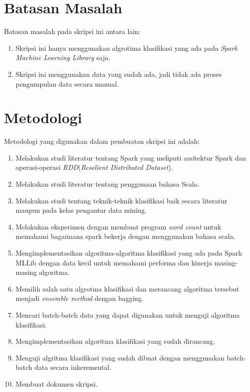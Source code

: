 \section{Batasan Masalah}
\label{sec:batasan}
Batasan masalah pada skripsi ini antara lain:
\begin{enumerate}
\item Skripsi ini hanya menggunakan algrotima klasifikasi yang ada pada \textit{Spark Machine Learning Library} saja.
\item Skripsi ini menggunakan data yang sudah ada, jadi tidak ada proses pengumpulan data secara manual.
\end{enumerate}


\section{Metodologi}
\label{sec:metlit}
Metodologi yang digunakan dalam pembuatan skripsi ini adalah:
\begin{enumerate}
\item Melakukan studi literatur tentang Spark yang meliputi arsitektur Spark dan operasi-operasi \textit{RDD}(\textit{Reselient Distributed Dataset}).
\item Melakukan studi literatur tentang penggunaan bahasa Scala.
\item Melakukan studi tentang teknik-teknik klasifikasi baik secara literatur maupun pada kelas pengantar data mining.
\item Melakukan eksperimen dengan membuat program \textit{word count} untuk memahami bagaimana spark bekerja dengan menggunakan bahasa scala.
\item Mengimplementasikan algoritma-algoritma klasifikasi yang ada pada Spark MLLib dengan data kecil untuk memahami performa dan kinerja masing-masing algoritma.
\item Memilih salah satu algrotma klasifikasi dan merancang algoritma tersebut menjadi \textit{ensemble method} dengan bagging.
\item Mencari batch-batch data yang dapat digunakan untuk menguji algoritma klasifikasi.
\item Mengimplementasikan algoritma klasifikasi yang sudah dirancang.
\item Menguji algritma klasifikasi yang sudah dibuat dengan menggunakan batch-batch data secara inkeremental.
\item Membuat dokumen skripsi.
\end{enumerate}


